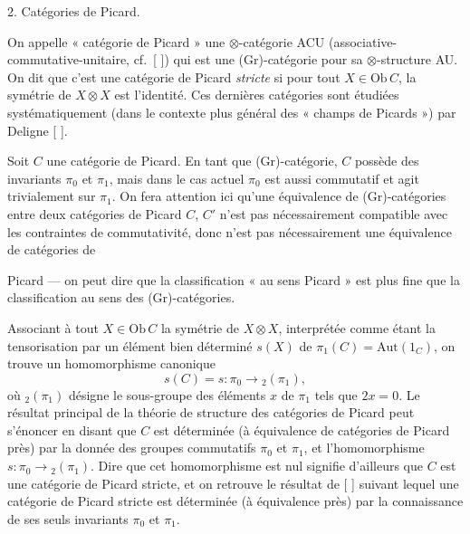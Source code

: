 \documentclass[11pt,a4paper]{article}
\begin{document}
2. Catégories de Picard.

On appelle « catégorie de Picard » une $\otimes$-catégorie ACU
(associative-commutative-unitaire, cf.\ [ ]) qui est une (Gr)-catégorie
pour sa \struck{\ill} $\otimes$-structure AU. On dit que c'est une
catégorie de Picard \emph{stricte} si pour tout $X \in \mathrm{Ob}\,C$, la
symétrie de $X \otimes X$ est l'identité. Ces \struck{\ill} dernières
catégories sont étudiées systématiquement (dans le contexte plus général
des « champs de Picards ») par Deligne [ ].

Soit $C$ une catégorie de Picard. En tant que (Gr)-catégorie, $C$ possède
des invariants $\pi_{0}$ et $\pi_{1}$, mais dans le cas actuel $\pi_{0}$
est aussi commutatif et agit trivialement sur $\pi_{1}$.
On fera attention ici qu'une équivalence de (Gr)-catégories entre deux
catégories de Picard $C$, $C'$ n'est pas nécessairement compatible avec
les contraintes de commutativité, donc n'est pas nécessairement une
équivalence de catégories de

Picard — on peut dire que la classification « au sens Picard » est plus
fine que la classification au sens des (Gr)-catégories.

Associant à tout $X \in \mathrm{Ob}\,C$ la symétrie de $X \otimes X$,
interprétée comme \struck{\ill} étant la tensorisation par un élément bien
déterminé $s(X)$ de $\pi_{1}(C) = \mathrm{Aut}(1_{C})$, on trouve un
homomorphisme canonique
\[
s(C) = s : \pi_{0} \longrightarrow {}_{2}(\pi_{1}),
\]
où ${}_{2}(\pi_{1})$ désigne le sous-groupe des éléments $x$ de $\pi_{1}$
tels que $2x = 0$.  Le résultat principal de la théorie de
structure des catégories de Picard peut s'énoncer en disant que $C$ est
déterminée (à équivalence  de catégories de
Picard près) par la donnée des groupes commutatifs $\pi_{0}$ et $\pi_{1}$,
et l'homomorphisme $s : \pi_{0} \to {}_{2}(\pi_{1})$.  Dire que cet homomorphisme est nul
signifie d'ailleurs que $C$ est une catégorie de Picard stricte, et on
retrouve le résultat de [ ] suivant lequel une catégorie de Picard stricte
est déterminée (à équivalence près) par la connaissance de ses seuls
invariants $\pi_{0}$ et $\pi_{1}$.
\end{document}
